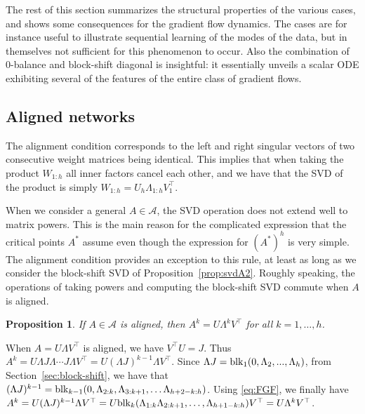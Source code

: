 \documentclass{article}
\makeatletter
\renewenvironment{proof}[1][\proofname]{
  \par\pushQED{\qed}\normalfont
  \topsep6\p@\@plus6\p@\relax
  \trivlist\item[\hskip\labelsep\bfseries#1\@addpunct{.}]
  \ignorespaces
}{
  \popQED\endtrivlist\@endpefalse
}
\newtheorem{proposition}{Proposition}
\def\block{{\rm blk}}
\newcommand{\1}{\mathds{1}}
\makeatother
\begin{document}
The rest of this section summarizes the structural properties of the various cases, and shows some consequences for the gradient flow dynamics. The cases are for instance useful to illustrate sequential learning of the modes of the data, but in themselves not sufficient for this phenomenon to occur.
Also the combination of 0-balance and block-shift diagonal is insightful: it essentially unveils a scalar ODE exhibiting several of the features of the entire class of gradient flows. 


\subsection{Aligned networks}

The alignment condition corresponds to the left and right singular vectors of two consecutive weight matrices being identical. This implies that when taking the product $ W_{1:h} $ all inner factors cancel each other, and we have that the SVD of the product is simply $ W_{1:h}= U_h \Lambda_{1:h} V_1^\top $.

When we consider a general $ A\in \mathcal{A}$, the SVD operation does not extend well to matrix powers. This is the main reason for the complicated expression that the critical points $A^\ast $ assume even though the expression for $(A^\ast)^h $ is very simple. The alignment condition provides an exception to this rule, at least as long as we consider the block-shift SVD of Proposition~\ref{prop:svdA2}. Roughly speaking, the operations of taking powers and computing the block-shift SVD commute when $A$ is aligned.


\begin{proposition}
\label{prop:A^k-SVD}
    If $ A \in \mathcal{ A } $ is aligned, then $ A^k = U \Lambda^k V^\top $ for all $ k=1,\ldots, h$.
\end{proposition}

\begin{proof}
When $ A = U \Lambda V^\top $ is aligned, we have $ V^\top U = J  $. Thus $ A^k = U \Lambda J \Lambda \cdots J \Lambda V^\top = U ( \Lambda J )^{k-1} \Lambda V^\top $. Since $ \Lambda J = \block_1(0, \Lambda_2, ..., \Lambda_h )$, from Section~\ref{sec:block-shift},  we have that $ ( \Lambda J )^{k-1} = \block_{k-1}(0,\Lambda_{2:k}, \Lambda_{3:k+1}, \ldots \Lambda_{h+2-k:h})$.
Using \eqref{eq:FGF}, we finally have $ A^k = U ( \Lambda J )^{k-1} \Lambda V^\top = U \block_k (\Lambda_{1:k} \Lambda_{2:k+1}, \ldots, \Lambda_{h+1-k:h}) V^\top = U \Lambda^k V^\top$.
\end{proof}
\end{document}
